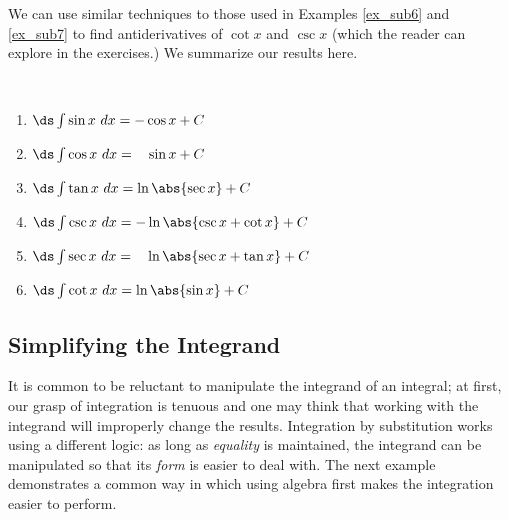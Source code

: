 We can use similar techniques to those used in Examples \ref{ex_sub6} and \ref{ex_sub7} to find antiderivatives of $\cot x$ and $\csc x$ (which the reader can explore in the exercises.) We summarize our results here.

{
\begin{theorem}\label{thm:triganti}
\mbox{}\\[-\baselineskip]
\begin{multicols}{2}\small
	\begin{enumerate}
	\item	$\ds \int \sin x \ dx = -\cos x +C$
	\item	$\ds\int \cos x\ dx = \phantom{-}\sin x + C$
	\item	$\ds \int \tan x\ dx = \ln\abs{\sec x}+C$
	\item	$\ds \int \csc x \ dx = -\ln\abs{\csc x+\cot x} +C$
	\item	$\ds\int \sec x\ dx = \phantom{-}\ln\abs{\sec x+\tan x} + C$
	\item	$\ds \int \cot x\ dx = \ln\abs{\sin x}+C$
\end{enumerate}
\end{multicols}
\end{theorem}
}


\subsection{Simplifying the Integrand}

It is common to be reluctant to manipulate the integrand of an integral; at first, our grasp of integration is tenuous and one may think that working with the integrand will improperly change the results. Integration by substitution works using a different logic: as long as \emph{equality} is maintained, the integrand can be manipulated so that its \emph{form} is easier to deal with. The next example demonstrates a common way in which using algebra first makes the integration easier to perform.

